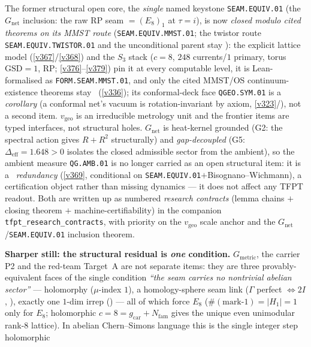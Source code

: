 \documentclass[11pt,a4paper]{article}
\newcommand{\gcar}{g_{\mathrm{car}}}
\newcommand{\Nfam}{N_{\mathrm{fam}}}
\begin{document}
\par\smallskip
\noindent The former structural open core, the \emph{single} named keystone \texttt{SEAM.EQUIV.01} (the
$G_{\mathrm{net}}$ inclusion: the raw RP seam $=(E_8)_1$ at $\tau{=}i$), is now \emph{closed modulo cited theorems
on its MMST route} (\texttt{SEAM.EQUIV.MMST.01}; the twistor route \texttt{SEAM.EQUIV.TWISTOR.01} and the
unconditional parent stay \mO):
the explicit lattice model (\vref{v367}/\vref{v368}) and the $S_3$ stack ($c{=}8$, $248$ currents/$1$ primary, torus
$\mathrm{GSD}{=}1$, RP; \vref{v376}--\vref{v379}) pin it at every computable level, it is Lean-formalised as
\texttt{FORM.SEAM.MMST.01}, and only the cited MMST/OS continuum-existence theorems stay \mO\ (\vref{v336}); its
conformal-deck face \texttt{QGEO.SYM.01} is a \emph{corollary} (a conformal net's vacuum is rotation-invariant by axiom,
\vref{v323}/), not a second item. $v_{\mathrm{geo}}$ is an irreducible metrology
unit and the frontier items are typed interfaces, not structural holes. $G_{\mathrm{net}}$ is heat-kernel
grounded (G2: the spectral action gives $R+R^2$ structurally) and \emph{gap-decoupled} (G5:
$\Delta_{\mathrm{eff}}{=}1.648{>}0$ isolates the closed admissible sector from the ambient), so the
ambient measure \texttt{QG.AMB.01} is no longer carried as an open structural item: it is a \mC\ \emph{redundancy}
(\vref{v369}, conditional on \texttt{SEAM.EQUIV.01}${+}$Bisognano--Wichmann), a certification object rather than
missing dynamics --- it does not affect any TFPT readout. Both are written up
as numbered \emph{research contracts} (lemma chains $+$ closing theorem $+$ machine-certifiability) in the
companion \texttt{tfpt\_research\_contracts}, with priority on the $v_{\mathrm{geo}}$ scale anchor and the
$G_{\mathrm{net}}$/\texttt{SEAM.EQUIV.01} inclusion theorem.
\par\smallskip\noindent\textbf{Sharper still: the structural residual is \emph{one} condition.} $G_{\mathrm{metric}}$,
the carrier P2 and the red-team Target~A are not separate items: they are three provably-equivalent faces of
the single condition \emph{``the seam carries no nontrivial abelian sector''} --- holomorphy ($\mu$-index
$1$), a homology-sphere seam link ($\Gamma$ perfect $\Leftrightarrow2I$, ),
exactly one $1$-dim irrep () --- all of which force $E_8$
($\#(\text{mark-}1)=|H_1|=1$ only for $E_8$; holomorphic $c=8=\gcar+\Nfam$ gives the unique even unimodular
rank-$8$ lattice). In abelian Chern--Simons language this is the single integer step holomorphic
\end{document}
